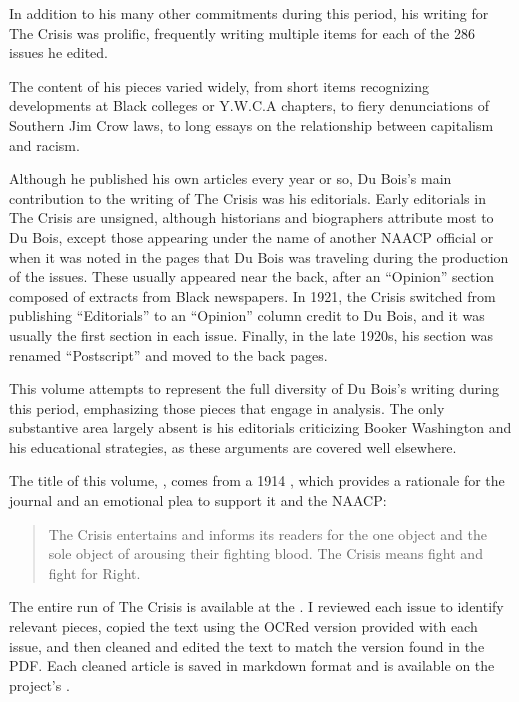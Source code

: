 \documentclass[letterpaper,10pt,english]{jupyterBook}
\begin{document}
\sphinxAtStartPar
In addition to his many other commitments during this period, his writing for The Crisis was prolific, frequently writing multiple items for each of the 286 issues he edited.

\sphinxAtStartPar
The content of his pieces varied widely, from short items recognizing developments at Black colleges or Y.W.C.A chapters, to fiery denunciations of Southern Jim Crow laws, to long essays on the relationship between capitalism and racism.

\sphinxAtStartPar
Although he published his own articles every year or so, Du Bois’s main contribution to the writing of The Crisis was his editorials. Early editorials in The Crisis are unsigned, although historians and biographers attribute most to Du Bois, except those appearing under the name of another NAACP official or when it was noted in the pages that Du Bois was traveling during the production of the issues. These usually appeared near the back, after an “Opinion” section composed of extracts from Black newspapers. In 1921, the Crisis switched from publishing “Editorials” to an “Opinion” column credit to Du Bois, and it was usually the first section in each issue. Finally, in the late 1920s, his section was renamed “Postscript” and moved to the back pages.

\sphinxAtStartPar
This volume attempts to represent the full diversity of Du Bois’s writing during this period, emphasizing those pieces that engage in analysis. The only substantive area largely absent is his editorials criticizing Booker Washington and his educational strategies, as these arguments are covered well elsewhere.

\sphinxAtStartPar
The title of this volume, , comes from a 1914 {\hyperref[\detokenize{Volumes/07/03/fightordie::doc}]{}}, which provides a rationale for the journal and an emotional plea to support it and the NAACP:
\begin{quote}

\sphinxAtStartPar
The Crisis entertains and informs its readers for the one object and the sole object of arousing their fighting blood. The Crisis means fight and fight for Right.
\end{quote}

\sphinxAtStartPar
The entire run of The Crisis is available at the . I reviewed each issue to identify relevant pieces, copied the text using the OCRed version provided with each issue, and then cleaned and edited the text to match the version found in the PDF. Each cleaned article is saved in markdown format and is available on the project’s .
\end{document}
